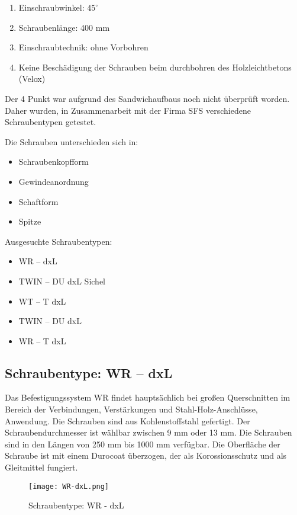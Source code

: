 \documentclass[12 pt,a4 paper ]{scrreprt}
\begin{document}
\begin{enumerate} 
	\item Einschraubwinkel: $45^{\circ}$
	\item Schraubenlänge: 400 mm
	\item Einschraubtechnik: ohne Vorbohren
	\item Keine Beschädigung der Schrauben beim durchbohren des Holzleichtbetons (Velox)
\end{enumerate}


Der 4 Punkt war aufgrund des Sandwichaufbaus noch nicht überprüft worden. Daher wurden, in Zusammenarbeit mit der Firma SFS verschiedene Schraubentypen getestet. 

Die Schrauben unterschieden sich in: 

\begin{itemize}
	\item Schraubenkopfform
	\item Gewindeanordnung
	\item Schaftform
	\item Spitze
\end{itemize}

Ausgesuchte Schraubentypen: 


\begin{itemize}
	\item WR – dxL
	\item TWIN – DU dxL Sichel
	\item WT – T dxL 
	\item TWIN – DU dxL
	\item WR – T  dxL
\end{itemize}
	
\subsection{Schraubentype:	 WR – dxL}
Das Befestigungssystem WR findet hauptsächlich bei großen Querschnitten im Bereich der Verbindungen, Verstärkungen und Stahl-Holz-Anschlüsse, Anwendung. Die Schrauben sind aus Kohlenstoffstahl gefertigt. Der Schraubendurchmesser ist wählbar zwischen 9 mm oder 13 mm. Die Schrauben sind in den Längen von  250 mm bis 1000 mm verfügbar. Die Oberfläche der Schraube ist mit einem Durocoat überzogen, der als Korossionsschutz und als Gleitmittel fungiert.

\begin{figure}[h]
\begin{center}
\texttt{[image: WR-dxL.png]}
\caption{Schraubentype: WR - dxL}
\end{center}
\end{figure}
\end{document}
